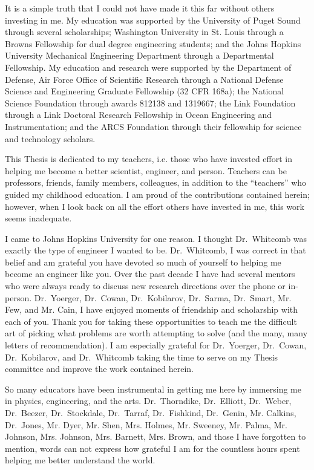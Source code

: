It is a simple truth that I could not have made it this far without
others investing in me.
%
My education was supported by the University of Puget Sound through
several scholarships; Washington University in St. Louis through a
Browns Fellowship for dual degree engineering students; and the Johns
Hopkins University Mechanical Engineering Department through a
Departmental Fellowship.
%
My education and research were supported by the Department of Defense,
Air Force Office of Scientific Research through a National Defense
Science and Engineering Graduate Fellowship (32 CFR 168a); the
National Science Foundation through awards 812138 and 1319667; the
Link Foundation through a Link Doctoral Research Fellowship in Ocean
Engineering and Instrumentation; and the ARCS Foundation through their
fellowship for science and technology scholars.



This Thesis is dedicated to my teachers, i.e.  those who have invested
effort in helping me become a better scientist, engineer, and person.
%
Teachers can be professors, friends, family members, colleagues, in
addition to the ``teachers'' who guided my childhood education.
%
I am proud of the contributions contained herein; however, when I look
back on all the effort others have invested in me, this work seems
inadequate.



I came to Johns Hopkins University for one reason.  I thought
Dr.\ Whitcomb was exactly the type of engineer I wanted to be.
%
Dr.\ Whitcomb, I was correct in that belief and am grateful you have
devoted so much of yourself to helping me become an engineer like you.
%
Over the past decade I have had several mentors who were always ready
to discuss new research directions over the phone or in-person.
%
Dr.\ Yoerger, Dr.\ Cowan, Dr.\ Kobilarov, Dr.\ Sarma, Dr.\ Smart, Mr. Few,
and Mr. Cain, I have enjoyed moments of friendship and scholarship
with each of you.  
%
Thank you for taking these opportunities to teach me the difficult art
of picking what problems are worth attempting to solve (and the many,
many letters of recommendation).
%
I am especially grateful for Dr.\ Yoerger, Dr.\ Cowan, Dr.\ Kobilarov,
and Dr.\ Whitcomb taking the time to serve on my Thesis committee and
improve the work contained herein.


So many educators have been instrumental in getting me here by
immersing me in physics, engineering, and the arts.
%
Dr.\ Thorndike, Dr.\ Elliott, Dr.\ Weber, Dr.\ Beezer, 
%
Dr.\ Stockdale, 
%
Dr.\ Tarraf, Dr.\ Fishkind, 
%
Dr.\ Genin,
%
Mr. Calkins, Dr.\ Jones, Mr. Dyer, Mr. Shen, Mrs. Holmes, Mr. Sweeney,
Mr. Palma,
%
Mr. Johnson, 
%
Mrs. Johnson, Mrs. Barnett, Mrs. Brown, and  
%
those I have forgotten to mention, 
%
words can not express how grateful I am for the countless hours spent
helping me better understand the world.  


